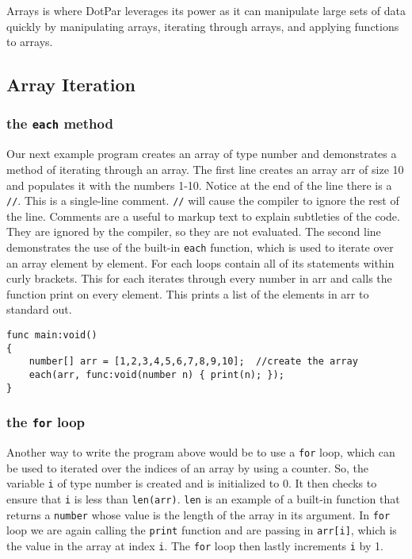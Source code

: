 \documentclass{article}
\begin{document}
Arrays is where DotPar leverages its power as it can manipulate large sets of data quickly by manipulating arrays, iterating through arrays, and applying functions to arrays. 

\subsection{Array Iteration}
\subsubsection{the \verb!each! method}
Our next example program creates an array of type number and demonstrates a method of iterating through an array. The first line creates an array arr of size 10 and populates it with the numbers 1-10. Notice at the end of the line there is a \verb!//!. This is a single-line comment. \verb!//! will cause the compiler to ignore the rest of the line. Comments are a useful to markup text to explain subtleties of the code. They are ignored by the compiler, so they are not evaluated. The second line demonstrates the use of the built-in \verb!each! function, which is used to iterate over an array element by element. For each loops contain all of its statements within curly brackets.  This for each iterates through every number in arr and calls the function print on every element. This prints a list of the elements in arr to standard out.

\begin{verbatim}
func main:void()
{
    number[] arr = [1,2,3,4,5,6,7,8,9,10];  //create the array
    each(arr, func:void(number n) { print(n); });
}
\end{verbatim}

\subsubsection{the \verb!for! loop}
Another way to write the program above would be to use a \verb!for! loop, which can be used to iterated over the indices of an array by using a counter. So, the variable \verb!i! of type number is created and is initialized to 0. It then checks to ensure that \verb!i! is less than \verb!len(arr)!. \verb!len! is an example of a built-in function that returns a \verb!number! whose value is the length of the array in its argument. In \verb!for! loop we are again calling the \verb!print! function and are passing in \verb!arr[i]!, which is the value in the array at index \verb!i!. The \verb!for! loop then lastly increments \verb!i! by 1.
\end{document}
